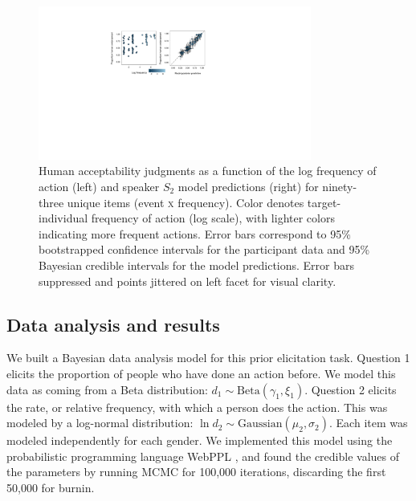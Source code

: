\documentclass[10pt,letterpaper]{article}
\begin{document}
\begin{figure}[t]
\centering
  \includegraphics[width=0.8\textwidth]{tj-scatters}
  \caption{Human acceptability judgments as a function of the log frequency of action (left) and speaker $S_2$ model predictions (right) for ninety-three unique items (event \textsc{x} frequency). 
  Color denotes target-individual frequency of action (log scale), with lighter colors indicating more frequent actions. Error bars correspond to 95\% bootstrapped confidence intervals for the participant data and 95\% Bayesian credible intervals for the model predictions. Error bars suppressed and points jittered on left facet for visual clarity.}
  \label{fig:tjScatters}
\end{figure}


\subsection{Data analysis and results}
We built a Bayesian data analysis model for this prior elicitation task.
Question 1 elicits the proportion of people who have done an action before. 
We model this data as coming from a Beta distribution: $d_{1} \sim \text{Beta}(\gamma_{1}, \xi_{1})$. 
Question 2 elicits the rate, or relative frequency, with which a person does the action.
This was modeled by a log-normal distribution: $\ln d_{2} \sim \text{Gaussian}(\mu_{2}, \sigma_{2})$. 
Each item was modeled independently for each gender.
We implemented this model using the probabilistic programming language WebPPL \cite{dippl}, and found the credible values of the parameters by running MCMC for 100,000 iterations, discarding the first 50,000 for burnin.
%
\end{document}
